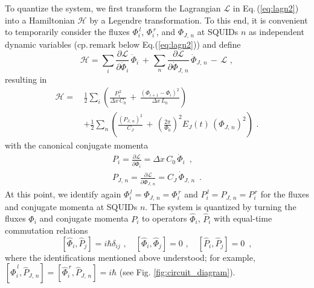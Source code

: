 To quantize the system, we first transform the Lagrangian $\mathcal{L}$ in Eq.\,(\ref{eq:lagn2})
into a Hamiltonian $\mathcal{H}$ by a Legendre transformation.
To this end, it is convenient to temporarily consider the fluxes $\Phi_i^{\,l}$, $\Phi_i^{\,r}$, and $\Phi_{J,\,n}$ 
at SQUIDs $n$ as independent dynamic variables (cp.\,remark below Eq.(\ref{eq:lagn2})) and define 
%
\begin{equation} \label{eq:ham1}
\mathcal{H} = \sum_{i} \frac{\partial\mathcal{L}}{\partial\dot{\Phi}_i} \, \dot{\Phi}_i 
\, + \, \sum_{n} \frac{\partial\mathcal{L}}{\partial\dot{\Phi}_{J,\,n}} \, \dot{\Phi}_{J,\,n}
\, - \, \mathcal{L} \, \, , 
\end{equation}
%
resulting in
%
\begin{equation} \label{eq:ham2}
\begin{split}
\mathcal{H} = \, & \frac{1}{2} \sum_i \left( \frac{P_i^{\,2}}{\Delta x \, C_{0}} \, + \, 
\frac{\left(\Phi_{i+1} - \Phi_{i}\right)^{2}}{\Delta x \, L_{0}} \right)  \\[2mm]
& + \frac{1}{2} \sum_n \left( \frac{\left(P_{J,\,n}\right)^2}{C_{J}} \, + \, 
 \left(\frac{2 \pi}{\Phi_0} \right)^2 E_J(t) \, \left( \Phi_{J,\,n} \right)^2 
\right) \, \, .
\end{split}
\end{equation}
%
with the canonical conjugate momenta
%
\begin{subequations} \label{eq:mom}
\begin{eqnarray} 
P_i = \frac{\partial\mathcal{L}}{\partial\dot{\Phi}_i} = \Delta x \, C_0 \, \dot{\Phi}_i \label{eq:moma} \, \, \, , \\[2mm]
P_{J,\,n} = \frac{\partial\mathcal{L}}{\partial\dot{\Phi}_{J,\,n}} =  C_J \, \dot{\Phi}_{J,\,n} \, \, \,  . \label{eq:momb}
\end{eqnarray}
\end{subequations}
%
At this point, we identify again 
$\Phi_i^{\,l} = \Phi_{J,\,n} = \Phi_i^{\,r}$ and $P_i^{\,l} = P_{J,\,n} = P_i^{\,r}$
for the fluxes and conjugate momenta at SQUIDs $n$.
The system is quantized by turning the fluxes $\Phi_i$ and conjugate momenta $P_i$ 
to operators $\hat{\Phi}_i$, $\hat{P}_i$ with equal-time commutation relations
%
\begin{equation} \label{eq:cr} 
\left[\hat{\Phi}_i, \hat{P}_j \right] = i \hbar \delta_{ij} \, \, , \quad 
\left[\hat{\Phi}_i, \hat{\Phi}_j \right] = 0 \, \, , \quad 
\left[\hat{P}_i, \hat{P}_j \right] = 0 \, \, \, , 
\end{equation}
%
where the identifications mentioned above understood; for example, 
$\left[\hat{\Phi}_i^{\,l}, \hat{P}_{J,\,n} \right] = \left[\hat{\Phi}_i^{\,r}, \hat{P}_{J,\,n} \right] = i \hbar$ (see Fig. \ref{fig:circuit_diagram}).

